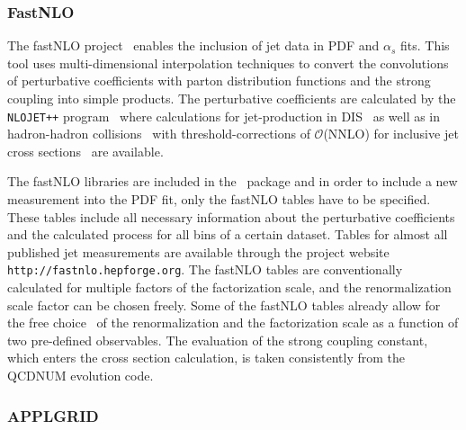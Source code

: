 \subsubsection{FastNLO} 

The fastNLO project~\cite{Kluge:2006xs,Wobisch:2011ij,Britzger:2012bs}
enables the inclusion of jet data in PDF and $\alpha_s$ fits.
This tool uses multi-dimensional interpolation
techniques to convert the convolutions of perturbative 
coefficients with parton distribution functions and 
the strong coupling into simple products.
The perturbative 
coefficients are calculated by the \texttt{NLOJET++}
program~\cite{Nagy:1998bb} where calculations for jet-production
in DIS~\cite{Nagy:2001xb}  as well as in hadron-hadron 
collisions~\cite{Nagy:2003tz,Nagy:2001fj} with threshold-corrections 
of $\mathcal{O}$(NNLO) for inclusive jet cross 
sections~\cite{Kidonakis:2000gi} are available.

The fastNLO libraries are included in the \fitter\ package
and in order to include a new measurement into the PDF fit,
only the fastNLO tables have to be specified. These tables include all
necessary information about the perturbative coefficients and the
calculated process for all bins of a certain dataset. 
Tables for almost all published jet measurements
are available through the project website \\ {\tt http://fastnlo.hepforge.org}.
%
The fastNLO tables are conventionally calculated
for multiple factors of the factorization scale, 
and the renormalization scale factor can be chosen freely.
Some of the fastNLO tables already allow for 
the free choice~\cite{Britzger:2012bs} of the renormalization and the factorization
scale as a function of two pre-defined observables.
The evaluation of the strong coupling constant, which enters
the cross section calculation, is taken consistently from the 
QCDNUM evolution code.

\subsubsection{APPLGRID}

